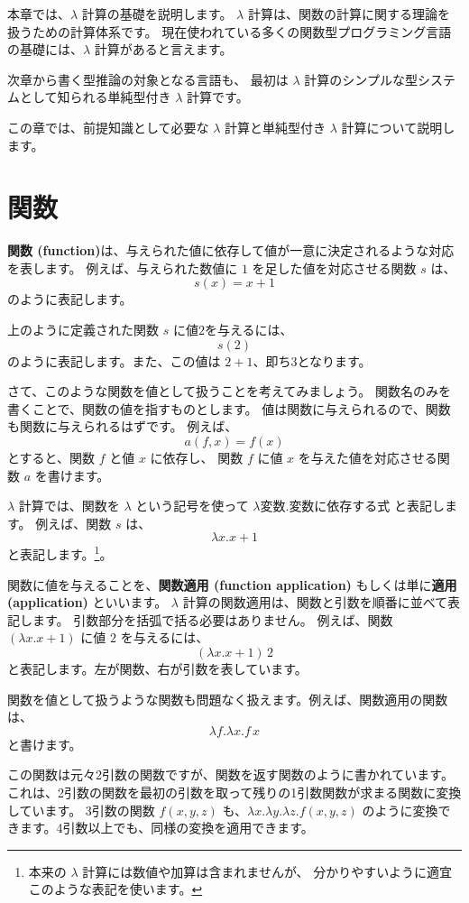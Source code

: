 
本章では、$\lambda$ 計算の基礎を説明します。
$\lambda$ 計算は、関数の計算に関する理論を扱うための計算体系です。
現在使われている多くの関数型プログラミング言語の基礎には、$\lambda$ 計算があると言えます。

次章から書く型推論の対象となる言語も、
最初は $\lambda$ 計算のシンプルな型システムとして知られる単純型付き $\lambda$ 計算です。

この章では、前提知識として必要な $\lambda$ 計算と単純型付き $\lambda$ 計算について説明します。

\section{関数}

\textbf{関数 (function)}は、与えられた値に依存して値が一意に決定されるような対応を表します。
例えば、与えられた数値に $1$ を足した値を対応させる関数 $s$ は、
\[
  s(x) = x+1
\]
のように表記します。

上のように定義された関数 $s$ に値$2$を与えるには、
\[
  s(2)
\]
のように表記します。また、この値は $2+1$、即ち$3$となります。

さて、このような関数を値として扱うことを考えてみましょう。
関数名のみを書くことで、関数の値を指すものとします。
値は関数に与えられるので、関数も関数に与えられるはずです。
例えば、
\[
  a(f, x) = f(x)
\]
とすると、関数 $f$ と値 $x$ に依存し、
関数 $f$ に値 $x$ を与えた値を対応させる関数 $a$ を書けます。

$\lambda$ 計算では、関数を $\lambda$ という記号を使って
$\lambda \text{変数} . \text{変数に依存する式}$ と表記します。
例えば、関数 $s$ は、
\[
  \lambda x . x + 1
\]
と表記します。\footnote{本来の $\lambda$ 計算には数値や加算は含まれませんが、
分かりやすいように適宜このような表記を使います。}。

関数に値を与えることを、\textbf{関数適用 (function application)}
もしくは単に\textbf{適用 (application)} といいます。
$\lambda$ 計算の関数適用は、関数と引数を順番に並べて表記します。
引数部分を括弧で括る必要はありません。
例えば、関数 $(\lambda x . x + 1)$ に値 $2$ を与えるには、
\[
  (\lambda x . x + 1) \, 2
\]
と表記します。左が関数、右が引数を表しています。

関数を値として扱うような関数も問題なく扱えます。例えば、関数適用の関数は、
\[
  \lambda f . \lambda x . f \, x
\]
と書けます。

この関数は元々2引数の関数ですが、関数を返す関数のように書かれています。
これは、2引数の関数を最初の引数を取って残りの1引数関数が求まる関数に変換しています。
3引数の関数 $f(x, y, z)$ も、$\lambda x . \lambda y . \lambda z . f(x, y, z)$
のように変換できます。4引数以上でも、同様の変換を適用できます。


